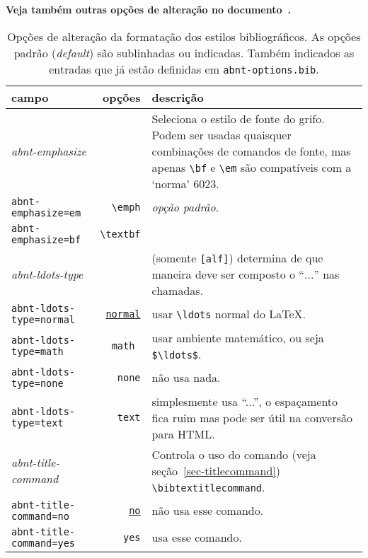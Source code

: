 \documentclass[espacosimples]{abnt}
\begin{document}
{\bf Veja também outras opções de alteração no documento~.}

\begin{table}[htbp]
\begin{center}
\begin{tabular}{lrp{8cm}}\hline\hline
campo & opções & descrição \\ \hline
\emph{abnt-emphasize} & & Seleciona o estilo de fonte do grifo.
Podem ser usadas quaisquer combinações de comandos de fonte, mas apenas
\verb+\bf+ e \verb+\em+ são compatíveis com a `norma' 6023. \\
{\tt abnt-emphasize=em} & \verb+\emph+ & {\em opção padrão}.  \\
{\tt abnt-emphasize=bf} & \verb+\textbf+ &
\\ \hline
\emph{abnt-ldots-type} && (somente {\tt [alf]}) determina de que maneira deve
ser composto o ``$\ldots$'' nas chamadas. \\
{\tt abnt-ldots-type=normal} & \underline{\tt normal} & usar \verb+\ldots+ normal do \LaTeX.\\
{\tt abnt-ldots-type=math} & \tt math & usar ambiente matemático, ou seja
\verb+$\ldots$+.\\
{\tt abnt-ldots-type=none} & {\tt none} & não usa nada.\\
{\tt abnt-ldots-type=text} & {\tt text} & simplesmente usa ``...'', o espaçamento
fica ruim mas pode ser útil na conversão para HTML.
\\ \hline
\emph{abnt-title-command} && Controla o uso do comando (veja
seção~\ref{sec-titlecommand}) \verb+\bibtextitlecommand+. \\
{\tt abnt-title-command=no} & \underline{\tt no} & não usa esse comando.\\
{\tt abnt-title-command=yes} & {\tt yes} & usa esse comando.
\\ \hline\hline
\end{tabular}
\end{center}
\caption[Opções de alteração dos estilos bibliográficos: formatação]{
Opções de alteração da formatação dos estilos bibliográficos.
As opções padrão (\emph{default}) são sublinhadas ou indicadas.
Também indicados as entradas que já estão definidas em {\tt abnt-options.bib}.}
\label{tabela-opcoes-formatacao}
\end{table}
\end{document}
